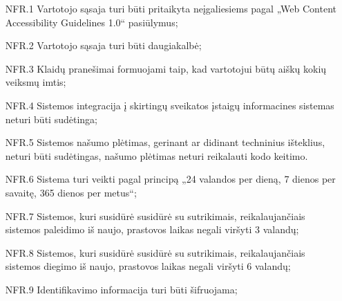 \begin{itemize}
    \item [NFR.1] Vartotojo sąsaja turi būti pritaikyta neįgaliesiems pagal „Web Content Accessibility Guidelines 1.0“ pasiūlymus;
    \item [NFR.2] Vartotojo sąsaja turi būti daugiakalbė;
    \item [NFR.3] Klaidų pranešimai formuojami taip, kad vartotojui būtų aiškų kokių veiksmų imtis;
    \item [NFR.4] Sistemos integracija į skirtingų sveikatos įstaigų informacines sistemas neturi būti sudėtinga;
    \item [NFR.5] Sistemos našumo plėtimas, gerinant ar didinant techninius išteklius, neturi būti sudėtingas, našumo plėtimas neturi reikalauti kodo keitimo.
    \item [NFR.6] Sistema turi veikti pagal principą „24 valandos per dieną, 7 dienos per savaitę, 365 dienos per metus“;
    \item [NFR.7] Sistemos, kuri susidūrė susidūrė su sutrikimais, reikalaujančiais sistemos paleidimo iš naujo, prastovos laikas negali viršyti 3 valandų;
    \item [NFR.8] Sistemos, kuri susidūrė susidūrė su sutrikimais, reikalaujančiais sistemos diegimo iš naujo, prastovos laikas negali viršyti 6 valandų;
    \item [NFR.9] Identifikavimo informacija turi būti šifruojama;
\end{itemize}